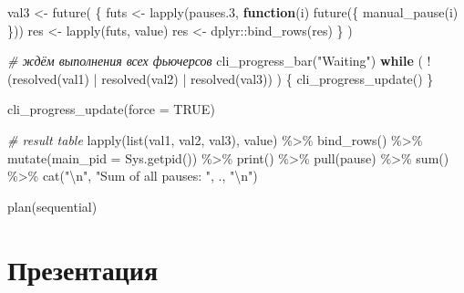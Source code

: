 \documentclass[
]{book}
\newenvironment{Shaded}{\begin{snugshade}}{\end{snugshade}}
\newcommand{\AttributeTok}[1]{\textcolor[rgb]{0.77,0.63,0.00}{#1}}
\newcommand{\CommentTok}[1]{\textcolor[rgb]{0.56,0.35,0.01}{\textit{#1}}}
\newcommand{\ConstantTok}[1]{\textcolor[rgb]{0.00,0.00,0.00}{#1}}
\newcommand{\ControlFlowTok}[1]{\textcolor[rgb]{0.13,0.29,0.53}{\textbf{#1}}}
\newcommand{\FloatTok}[1]{\textcolor[rgb]{0.00,0.00,0.81}{#1}}
\newcommand{\FunctionTok}[1]{\textcolor[rgb]{0.00,0.00,0.00}{#1}}
\newcommand{\NormalTok}[1]{#1}
\newcommand{\OtherTok}[1]{\textcolor[rgb]{0.56,0.35,0.01}{#1}}
\newcommand{\SpecialCharTok}[1]{\textcolor[rgb]{0.00,0.00,0.00}{#1}}
\newcommand{\StringTok}[1]{\textcolor[rgb]{0.31,0.60,0.02}{#1}}
\begin{document}
\begin{Shaded}
\begin{Highlighting}[]
\NormalTok{val3 }\OtherTok{\textless{}{-}} \FunctionTok{future}\NormalTok{(}
\NormalTok{  \{}
\NormalTok{    futs }\OtherTok{\textless{}{-}} \FunctionTok{lapply}\NormalTok{(pauses}\FloatTok{.3}\NormalTok{, }\ControlFlowTok{function}\NormalTok{(i) }\FunctionTok{future}\NormalTok{(\{ }\FunctionTok{manual\_pause}\NormalTok{(i) \}))}
\NormalTok{    res  }\OtherTok{\textless{}{-}} \FunctionTok{lapply}\NormalTok{(futs, value) }
\NormalTok{    res  }\OtherTok{\textless{}{-}}\NormalTok{ dplyr}\SpecialCharTok{::}\FunctionTok{bind\_rows}\NormalTok{(res)}
\NormalTok{  \}}
\NormalTok{) }

\CommentTok{\# ждём выполнения всех фьючерсов}
\FunctionTok{cli\_progress\_bar}\NormalTok{(}\StringTok{"Waiting"}\NormalTok{)}
\ControlFlowTok{while}\NormalTok{ ( }\SpecialCharTok{!}\NormalTok{ (}\FunctionTok{resolved}\NormalTok{(val1) }\SpecialCharTok{|} \FunctionTok{resolved}\NormalTok{(val2) }\SpecialCharTok{|} \FunctionTok{resolved}\NormalTok{(val3)) ) \{}
  \FunctionTok{cli\_progress\_update}\NormalTok{()}
\NormalTok{\}}

\FunctionTok{cli\_progress\_update}\NormalTok{(}\AttributeTok{force =} \ConstantTok{TRUE}\NormalTok{)}

\CommentTok{\# result table}
\FunctionTok{lapply}\NormalTok{(}\FunctionTok{list}\NormalTok{(val1, val2, val3), value) }\SpecialCharTok{\%\textgreater{}\%} 
  \FunctionTok{bind\_rows}\NormalTok{() }\SpecialCharTok{\%\textgreater{}\%}  
  \FunctionTok{mutate}\NormalTok{(}\AttributeTok{main\_pid =} \FunctionTok{Sys.getpid}\NormalTok{()) }\SpecialCharTok{\%\textgreater{}\%} 
  \FunctionTok{print}\NormalTok{() }\SpecialCharTok{\%\textgreater{}\%}
  \FunctionTok{pull}\NormalTok{(pause) }\SpecialCharTok{\%\textgreater{}\%} 
  \FunctionTok{sum}\NormalTok{()  }\SpecialCharTok{\%\textgreater{}\%} 
  \FunctionTok{cat}\NormalTok{(}\StringTok{"}\SpecialCharTok{\textbackslash{}n}\StringTok{"}\NormalTok{, }\StringTok{"Sum of all pauses: "}\NormalTok{, ., }\StringTok{"}\SpecialCharTok{\textbackslash{}n}\StringTok{"}\NormalTok{)}

\FunctionTok{plan}\NormalTok{(sequential)}
\end{Highlighting}
\end{Shaded}

\hypertarget{ux43fux440ux435ux437ux435ux43dux442ux430ux446ux438ux44f-4}{%
\section{Презентация}\label{ux43fux440ux435ux437ux435ux43dux442ux430ux446ux438ux44f-4}}
\end{document}

